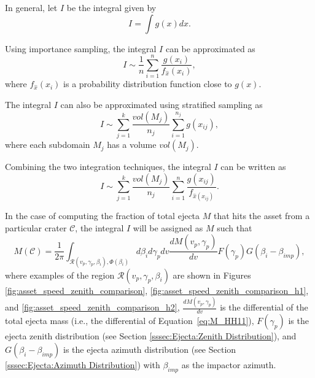 \documentclass{article}
\begin{document}
In general, let $I$ be the integral given by
\begin{equation}
I = \int g(x)dx.
\end{equation}

Using importance sampling, the integral $I$ can be approximated as
\begin{equation}
I \sim \frac{1}{n}\sum_{i=1}^{n}\frac{g(x_i)}{f_{\hat{x}}(x_i)},
\end{equation}
where $f_{\hat{x}}(x_i)$ is a probability distribution function close to $g(x)$.

The integral $I$ can also be approximated using stratified sampling as
\begin{equation}
I \sim \sum_{j=1}^{k}\frac{vol(M_j)}{n_j}\sum_{i=1}^{n_j}g(x_{ij}),
\end{equation}
where each subdomain $M_j$ has a volume $vol(M_j)$.

Combining the two integration techniques, the integral $I$ can be written as
\begin{equation}
I \sim \sum_{j=1}^{k}\frac{vol(M_j)}{n_j}\sum_{i=1}^{n}\frac{g(x_{ij})}{f_{\hat{x}(x_{ij})}}.
\end{equation}


In the case of computing the fraction of total ejecta $M$ that hits the asset from a particular crater $\mathcal{C}$, the integral $I$ will be assigned as $M$ such that
\begin{equation}
M(\mathcal{C}) = \frac{1}{2\pi}\int_{\mathcal{R}(v_p,\gamma_p, \beta_i), \Phi(\beta_i)} d\beta_i d\gamma_p dv \frac{dM(v_p,\gamma_p)}{dv} F(\gamma_p) G(\beta_i-\beta_{imp}),
\end{equation}
where examples of the region $\mathcal{R}(v_p,\gamma_p, \beta_i)$ are shown in Figures \ref{fig:asset_speed_zenith_comparison}, \ref{fig:asset_speed_zenith_comparison_h1}, and \ref{fig:asset_speed_zenith_comparison_h2}, $\frac{dM(v_p,\gamma_p)}{dv}$ is the differential of the total ejecta mass (i.e., the differential of Equation~\eqref{eq:M_HH11}), $F(\gamma_p)$ is the ejecta zenith distribution (see Section \ref{sssec:Ejecta:Zenith Distribution}), and $G(\beta_i-\beta_{imp})$ is the ejecta azimuth distribution (see Section \ref{sssec:Ejecta:Azimuth Distribution}) with $\beta_{imp}$ as the impactor azimuth.
\end{document}

